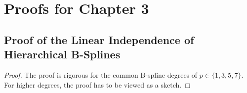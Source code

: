 \section{Proofs for Chapter 3}
\label{sec:a12chapter3}

\printornamentsfalse
\subsection{Proof of the Linear Independence of Hierarchical B-Splines}
\label{sec:a121proofHierBSplineLinearlyIndependent}
\printornamentstrue

\propHierBSplineLinearlyIndependent*

\begin{proof}
  The proof is rigorous for the common B-spline degrees of
  $p \in \{1, 3, 5, 7\}$.
  For higher degrees, the proof has to be viewed as a sketch.
  

\end{proof}
